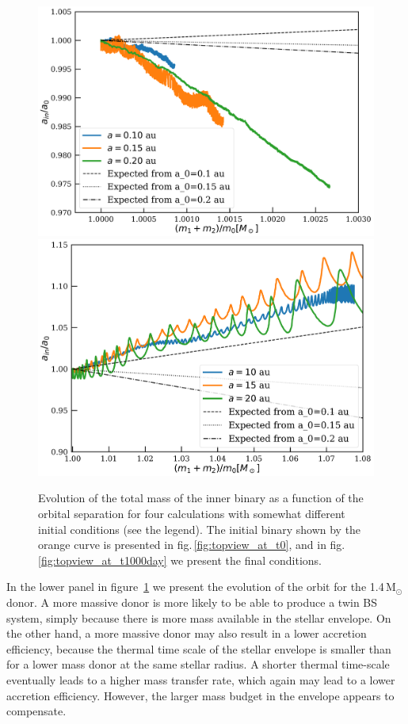 \documentclass{aastex62}
\newcommand{\MSun}{\mbox{M$_\odot$}}
\begin{document}
\begin{figure}[ht!]
  \includegraphics[width=\columnwidth]{fig_orbital_evolution_for_12MSun.pdf}
  \includegraphics[width=\columnwidth]{fig_orbital_evolution_for_14MSun.pdf}
  \caption{Evolution of the total mass of the inner binary as a
    function of the orbital separation for four calculations with
    somewhat different initial conditions (see the legend).  The initial
    binary shown by the orange curve is presented in
    fig.\,\ref{fig:topview_at_t0}, and in
    fig.\,\ref{fig:topview_at_t1000day} we present the final
    conditions.
\label{fig:mass_vs_semimajor_axis}}
\end{figure}

In the lower panel in figure~\ref{fig:mass_vs_semimajor_axis} we
present the evolution of the orbit for the 1.4\,\MSun\, donor. A more
massive donor is more likely to be able to produce a twin BS system, simply because there is more mass available in the stellar
envelope. On the other hand, a more massive donor may also result in a
lower accretion efficiency, because the thermal time scale of the
stellar envelope is smaller than for a lower mass donor at the same
stellar radius. A shorter thermal time-scale eventually leads to
a higher mass transfer rate, which again may lead to a lower accretion
efficiency. However, the larger mass budget in the envelope appears to
compensate.
\end{document}
